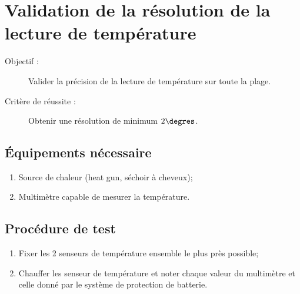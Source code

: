 
\section{Validation de la résolution de la lecture de température}

	\begin{description}
		\item[Objectif :] Valider la précision de la lecture de température sur toute la plage.
		\item[Critère de réussite :] Obtenir une résolution de minimum $2 \degres$.
	\end{description}
	
	\subsection*{Équipements nécessaire}
	\begin{enumerate}
		\item Source de chaleur (heat gun, séchoir à cheveux);
		\item Multimètre capable de mesurer la température.
	\end{enumerate}	
	
	\subsection*{Procédure de test}
	\begin{enumerate}
		\item Fixer les 2 senseurs de température ensemble le plus près possible; 
		\item Chauffer les senseur de température et noter chaque valeur du multimètre et celle donné par le système de protection de batterie.
	\end{enumerate}